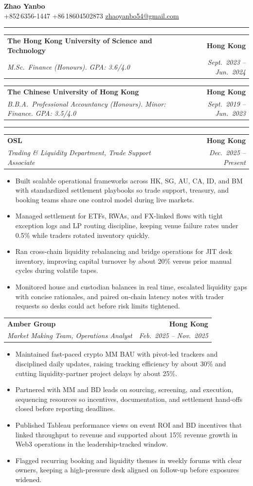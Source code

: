 \documentclass[9pt,a4paper]{extarticle}
\makeatletter
\newcommand{\ressection}[1]{%
  \vspace{0.8em}%
  \noindent{\large\scshape\bfseries #1}\par\nobreak
  \vspace{-\parskip}%
  \vspace{-\parskip}%
  \vspace{-\parskip}%
  \vspace{-\parskip}%
  \noindent\rule{\linewidth}{0.1pt}\par\nobreak
  \vspace{-\parskip}%
}
\newcommand{\resumeSubheading}[4]{%
  \vspace{0.6em}%
  \begin{tabular*}{\textwidth}{l@{\extracolsep{\fill}}r}
    \textbf{#1} & \textbf{#2} \\
    \textit{\small #3} & \textit{\small #4} \\
  \end{tabular*}\vspace{0.32em}}
\makeatother
\begin{document}
\begin{center}
  {\LARGE\bfseries Zhao Yanbo}\\[0.35em]
  \small
  +852\,6356-1447 \;\textbar\;
  +86\,18604502873 \;\textbar\;
  \href{mailto:zhaoyanbo54@gmail.com}{zhaoyanbo54@gmail.com}
\end{center}
\vspace{-0.2em}

\ressection{Education}

\resumeSubheading{The Hong Kong University of Science and Technology}{Hong Kong}{M.Sc.\ Finance (Honours). GPA: 3.6/4.0}{Sept.\ 2023 -- Jun.\ 2024}

\resumeSubheading{The Chinese University of Hong Kong}{Hong Kong}{B.B.A.\ Professional Accountancy (Honours). Minor: Finance. GPA: 3.5/4.0}{Sept.\ 2019 -- Jun.\ 2023}

\ressection{Work Experience}

\resumeSubheading{OSL}{Hong Kong}{Trading \& Liquidity Department, Trade Support Associate}{Dec.\ 2025 -- Present}
\begin{itemize}
  \item Built scalable operational frameworks across HK, SG, AU, CA, ID, and BM with standardized settlement playbooks so trade support, treasury, and booking teams share one control model during live markets.
  \item Managed settlement for ETFs, RWAs, and FX-linked flows with tight exception logs and LP routing discipline, keeping venue failure rates under 0.5\% while traders rotated inventory quickly.
  \item Ran cross-chain liquidity rebalancing and bridge operations for JIT desk inventory, improving capital turnover by about 20\% versus prior manual cycles during volatile tapes.
  \item Monitored house and custodian balances in real time, escalated liquidity gaps with concise rationales, and paired on-chain latency notes with trader requests so desks could act before risk limits tightened.
\end{itemize}

\resumeSubheading{Amber Group}{Hong Kong}{Market Making Team, Operations Analyst}{Feb.\ 2025 -- Nov.\ 2025}
\begin{itemize}
  \item Maintained fast-paced crypto MM BAU with pivot-led trackers and disciplined daily updates, raising tracking efficiency by about 30\% and cutting liquidity-partner project delays by about 25\%.
  \item Partnered with MM and BD leads on sourcing, screening, and execution, sequencing resources so incentives, documentation, and settlement hand-offs closed before reporting deadlines.
  \item Published Tableau performance views on event ROI and BD incentives that linked throughput to revenue and supported about 15\% revenue growth in Web3 operations in the leadership-tracked window.
  \item Flagged recurring booking and liquidity themes in weekly forums with clear owners, keeping a high-pressure desk aligned on follow-up before exposures widened.
\end{itemize}
\end{document}
